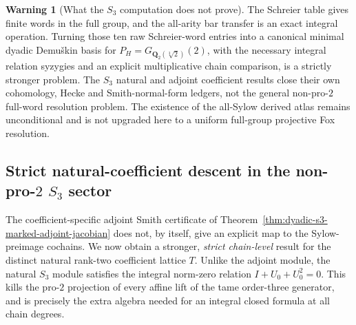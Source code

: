 \documentclass[11pt]{article}
\theoremstyle{definition}
\newtheorem{warning}[theorem]{Warning}
\begin{document}
\begin{warning}[What the $S_3$ computation does not prove]
\label{warn:dyadic-s3-syzygy-scope}
The Schreier table gives finite
words in the full group, and
the all-arity bar transfer is
an exact integral operation.
Turning those ten raw
Schreier-word entries into a
canonical minimal dyadic
Demu\v{s}kin basis for
$P_H=G_{\mathbf Q_2(\sqrt[3]2)}(2)$,
with the necessary
integral relation syzygies and
an explicit multiplicative
chain comparison, is a
strictly stronger problem.
The $S_3$ natural and adjoint
coefficient results close their
own cohomology, Hecke and
Smith-normal-form ledgers,
not the general non-pro-$2$
full-word resolution problem.
The existence of the
all-Sylow derived atlas
remains unconditional and is
not upgraded here to a
uniform full-group projective
Fox resolution.
\end{warning}


\subsection{Strict natural-coefficient descent in the non-pro-$2$ $S_3$ sector}
\label{subsec:dyadic-s3-natural-strict-transfer}

The coefficient-specific adjoint Smith certificate of
Theorem~\ref{thm:dyadic-s3-marked-adjoint-jacobian}
does not, by itself, give an explicit map to the
Sylow-preimage cochains.  We now obtain a stronger,
\emph{strict chain-level} result for the distinct
natural rank-two coefficient lattice $T$.
Unlike the adjoint module, the natural $S_3$ module
satisfies the integral norm-zero relation
$I+U_0+U_0^2=0$.  This kills the pro-$2$
projection of every affine lift of the tame
order-three generator, and is precisely the
extra algebra needed for an integral closed
formula at all chain degrees.
\end{document}

